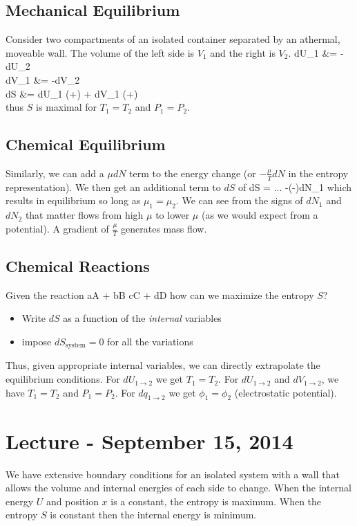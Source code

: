 \documentclass[12pt]{article}
\begin{document}
\subsection{Mechanical Equilibrium}
Consider two compartments of an isolated container separated by an athermal, moveable wall.  The volume of the left side is $V_1$ and the right is $V_2$.
\eqs
dU_1 &= -dU_2\\
dV_1 &= -dV_2\\
dS &= dU_1 (+) + dV_1 (+)\\
\eqe
thus $S$ is maximal for $T_1 = T_2$ and $P_1 = P_2$.
\subsection*{Chemical Equilibrium}
Similarly, we can add a $\mu dN$ term to the energy change (or $-\frac{\mu}{T}dN$ in the entropy representation).  We then get an additional term to $dS$ of 
\eqs
dS = ... -(-)dN_1
\eqe
which results in equilibrium so long as $\mu_1 = \mu_2$.  We can see from the signs of $dN_1$ and $dN_2$ that matter flows from high $\mu$ to lower $\mu$ (as we would expect from a potential).  A gradient of $\frac{\mu}{T}$ generates mass flow.

\subsection{Chemical Reactions}
Given the reaction
\eqs
aA + bB \rightarrow cC + dD
\eqe
how can we maximize the entropy $S$?
\begin{itemize}
\item Write $dS$ as a function of the \emph{internal} variables
\item impose $dS_\text{system} = 0$ for all the variations
\end{itemize}
Thus, given appropriate internal variables, we can directly extrapolate the equilibrium conditions.  For $dU_{1\rightarrow 2}$ we get $T_1 = T_2$.  For $dU_{1\rightarrow 2}$ and $dV_{1\rightarrow 2}$, we have $T_1 = T_2$ and $P_1 = P_2$.  For $dq_{1\rightarrow 2}$ we get $\phi_1 = \phi_2$ (electrostatic potential).

\section{Lecture - September 15, 2014}
We have extensive boundary conditions for an isolated system with a wall that allows the volume and internal energies of each side to change.   When the internal energy $U$ and position $x$ is a constant, the entropy is maximum.  When the entropy $S$ is constant then the internal energy is minimum.
\end{document}
